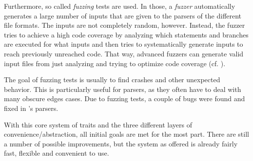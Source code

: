 Furthermore, so called \emph{fuzzing} tests are used.
In those, a \emph{fuzzer} automatically generates a large number of inputs that are given to the parsers of the different file formats.
The inputs are not completely random, however.
Instead, the fuzzer tries to achieve a high code coverage by analyzing which statements and branches are executed for what inputs and then tries to systematically generate inputs to reach previously unreached code.
That way, advanced fuzzers can generate valid input files from just analyzing and trying to optimize code coverage (cf. \cite{jpegfuzzing}).

The goal of fuzzing tests is usually to find crashes and other unexpected behavior.
This is particularly useful for parsers, as they often have to deal with many obscure edges cases.
Due to fuzzing tests, a couple of bugs were found and fixed in 's parsers.



\vspace{1.5cm}


With this core system of traits and the three different layers of convenience/abstraction, all initial goals are met for the most part.
There are still a number of possible improvements, but the system as offered is already fairly fast, flexible and convenient to use.
\vspace{6mm}
